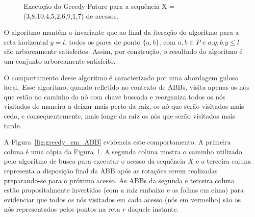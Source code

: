 \begin{figure}
    \caption{Execução do Greedy Future para a sequência X = (3,8,10,4,5,2,6,9,1,7) de acessos.}
\label{fig:GreedyFuture-funcionamento}
\end{figure}

O algoritmo mantém o invariante que ao final da iteração do algoritmo para a reta horizontal $y = l$, todos os pares de ponto $\{a,b\}$, com $a,b \in P$ e $a.y, b.y \leq l$ são arboreamente satisfeitos. Assim, por construção, o resultado do algoritmo é um conjunto arboreamente satisfeito.

O comportamento desse algoritmo é caracterizado por uma abordagem gulosa local. Esse algoritmo, quando refletido no contexto de ABBs, visita apenas os nós que estão no caminho do nó com chave buscada e reorganiza todos os nós visitados de maneira a deixar mais perto da raiz, os nó que serão visitados mais cedo, e consequentemente, mais longe da raiz os nós que serão visitados mais tarde. 

A Figura~\ref{fig:greedy_em_ABB} evidencia este comportamento. A primeira coluna é uma cópia da Figura~\ref{fig:GreedyFuture-funcionamento}. A segunda coluna mostra o caminho utilizado pelo algoritmo de busca para executar o acesso da sequência $X$ e a terceira coluna representa a disposição final da ABB após as rotações serem realizadas preparando-se para o próximo acesso. As ABBs da segunda e terceira coluna estão propositalmente invertidas (com a raiz embaixo e as folhas em cima) para evidenciar que todos os nós visitados em cada acesso (nós em vermelho) são os nós representados pelos pontos na reta $r$ daquele instante.


